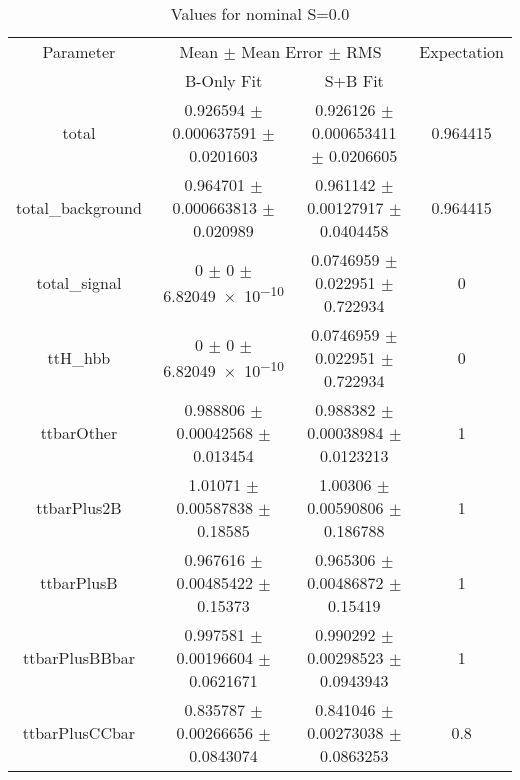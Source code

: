\begin{table}
\centering
\caption{Values for nominal S=0.0}
\begin{tabular}{cccc}
\toprule
Parameter & \multicolumn{2}{c}{Mean $\pm$ Mean Error $\pm$ RMS} & Expectation\\
 & B-Only Fit & S+B Fit & \\
\midrule
total & \num{0.926594} $\pm$ \num{0.000637591} $\pm$ \num{0.0201603} & \num{0.926126} $\pm$ \num{0.000653411} $\pm$ \num{0.0206605} & \num{0.964415}\\
total\_background & \num{0.964701} $\pm$ \num{0.000663813} $\pm$ \num{0.020989} & \num{0.961142} $\pm$ \num{0.00127917} $\pm$ \num{0.0404458} & \num{0.964415}\\
total\_signal & \num{0} $\pm$ \num{0} $\pm$ \num{6.82049e-10} & \num{0.0746959} $\pm$ \num{0.022951} $\pm$ \num{0.722934} & \num{0}\\
ttH\_hbb & \num{0} $\pm$ \num{0} $\pm$ \num{6.82049e-10} & \num{0.0746959} $\pm$ \num{0.022951} $\pm$ \num{0.722934} & \num{0}\\
ttbarOther & \num{0.988806} $\pm$ \num{0.00042568} $\pm$ \num{0.013454} & \num{0.988382} $\pm$ \num{0.00038984} $\pm$ \num{0.0123213} & \num{1}\\
ttbarPlus2B & \num{1.01071} $\pm$ \num{0.00587838} $\pm$ \num{0.18585} & \num{1.00306} $\pm$ \num{0.00590806} $\pm$ \num{0.186788} & \num{1}\\
ttbarPlusB & \num{0.967616} $\pm$ \num{0.00485422} $\pm$ \num{0.15373} & \num{0.965306} $\pm$ \num{0.00486872} $\pm$ \num{0.15419} & \num{1}\\
ttbarPlusBBbar & \num{0.997581} $\pm$ \num{0.00196604} $\pm$ \num{0.0621671} & \num{0.990292} $\pm$ \num{0.00298523} $\pm$ \num{0.0943943} & \num{1}\\
ttbarPlusCCbar & \num{0.835787} $\pm$ \num{0.00266656} $\pm$ \num{0.0843074} & \num{0.841046} $\pm$ \num{0.00273038} $\pm$ \num{0.0863253} & \num{0.8}\\
\bottomrule
\end{tabular}
\end{table}